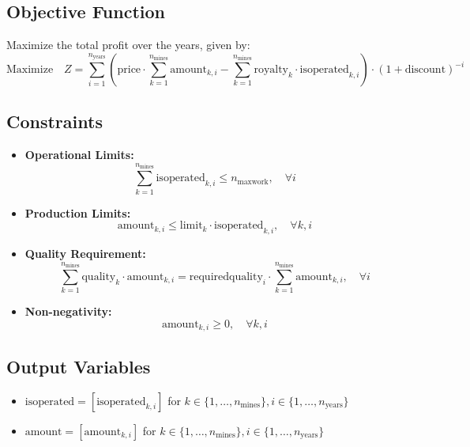 \documentclass{article}
\begin{document}
\subsection*{Objective Function}
Maximize the total profit over the years, given by:
\[
\text{Maximize} \quad Z = \sum_{i=1}^{n_{\text{years}}} \left( \text{price} \cdot \sum_{k=1}^{n_{\text{mines}}} \text{amount}_{k,i} - \sum_{k=1}^{n_{\text{mines}}} \text{royalty}_{k} \cdot \text{isoperated}_{k,i} \right) \cdot (1 + \text{discount})^{-i}
\]

\subsection*{Constraints}
\begin{itemize}
    \item \textbf{Operational Limits:}
    \[
    \sum_{k=1}^{n_{\text{mines}}} \text{isoperated}_{k,i} \leq n_{\text{maxwork}}, \quad \forall i
    \]

    \item \textbf{Production Limits:}
    \[
    \text{amount}_{k,i} \leq \text{limit}_{k} \cdot \text{isoperated}_{k,i}, \quad \forall k, i
    \]

    \item \textbf{Quality Requirement:}
    \[
    \sum_{k=1}^{n_{\text{mines}}} \text{quality}_{k} \cdot \text{amount}_{k,i} = \text{requiredquality}_{i} \cdot \sum_{k=1}^{n_{\text{mines}}} \text{amount}_{k,i}, \quad \forall i
    \]

    \item \textbf{Non-negativity:}
    \[
    \text{amount}_{k,i} \geq 0, \quad \forall k, i
    \]
\end{itemize}

\subsection*{Output Variables}
\begin{itemize}
    \item \( \text{isoperated} = [\text{isoperated}_{k,i}] \) for \( k \in \{1, \ldots, n_{\text{mines}}\}, i \in \{1, \ldots, n_{\text{years}}\} \)
    \item \( \text{amount} = [\text{amount}_{k,i}] \) for \( k \in \{1, \ldots, n_{\text{mines}}\}, i \in \{1, \ldots, n_{\text{years}}\} \)
\end{itemize}
\end{document}

